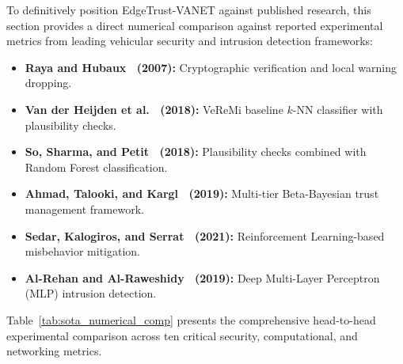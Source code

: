 \documentclass[conference]{IEEEtran}
\begin{document}
To definitively position EdgeTrust-VANET against published research, this section provides a direct numerical comparison against reported experimental metrics from leading vehicular security and intrusion detection frameworks:
\begin{itemize}
    \item \textbf{Raya and Hubaux~\cite{raya} (2007):} Cryptographic verification and local warning dropping.
    \item \textbf{Van der Heijden et al.~\cite{veremi} (2018):} VeReMi baseline $k$-NN classifier with plausibility checks.
    \item \textbf{So, Sharma, and Petit~\cite{so2018verifying} (2018):} Plausibility checks combined with Random Forest classification.
    \item \textbf{Ahmad, Talooki, and Kargl~\cite{ahmad2019trust} (2019):} Multi-tier Beta-Bayesian trust management framework.
    \item \textbf{Sedar, Kalogiros, and Serrat~\cite{sedar2020reinforcement} (2021):} Reinforcement Learning-based misbehavior mitigation.
    \item \textbf{Al-Rehan and Al-Raweshidy~\cite{alrehan2019machine} (2019):} Deep Multi-Layer Perceptron (MLP) intrusion detection.
\end{itemize}

Table~\ref{tab:sota_numerical_comp} presents the comprehensive head-to-head experimental comparison across ten critical security, computational, and networking metrics.
\end{document}
